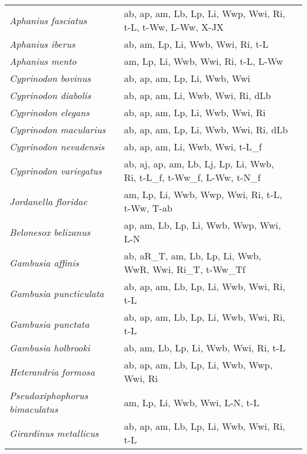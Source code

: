 {\begin{longtable}[c]{p{3.5cm}p{5.5cm}p{5.5cm}}
\emph{Aphanius fasciatus} &  ab, ap, am, Lb, Lp, Li, Wwp, Wwi, Ri, t-L, t-Ww, L-Ww, X-JX & \citet{SezeOlme2010,LeonSini1999,LeonSini1998} \\
\emph{Aphanius iberus} &  ab, am, Lp, Li, Wwb, Wwi, Ri, t-L & \citet{FernHern1988} \\
\emph{Aphanius mento} &  am, Lp, Li, Wwb, Wwi, Ri, t-L, L-Ww & \citet{GuclKucu2008,GuclKucu2011,Ergu2020} \\
\emph{Cyprinodon bovinus} &  ab, ap, am, Lp, Li, Wwb, Wwi & \citet{EPA2002,Cripe2009,Kenn1977,JordEver1896} \\
\emph{Cyprinodon diabolis} &  ab, ap, am, Li, Wwb, Wwi, Ri, dLb & \citet{DeacTay1995} \\
\emph{Cyprinodon elegans} &  ab, ap, am, Lp, Li, Wwb, Wwi, Ri & \citet{LeisItzk2003} \\
\emph{Cyprinodon macularius} &  ab, ap, am, Lp, Li, Wwb, Wwi, Ri, dLb & \citet{Scho1988} \\
\emph{Cyprinodon nevadensis} &  ab, ap, am, Li, Wwb, Wwi, t-L\_f & \citet{LemaNevi2006} \\
\emph{Cyprinodon variegatus} &  ab, aj, ap, am, Lb, Lj, Lp, Li, Wwb, Ri, t-L\_f, t-Ww\_f, L-Ww, t-N\_f & \citet{EPA2002,SchnDuss2017,CripHemm2009,Fost1967,PageBurr1991,JordEver1896,ParrDyar1978,RoseSand2004} \\
\emph{Jordanella floridae} &  am, Lp, Li, Wwb, Wwp, Wwi, Ri, t-L, t-Ww, T-ab & \citet{Beyg2009,FostCair1969,MaryGord2004} \\
\emph{Belonesox belizanus} &  ap, am, Lb, Lp, Li, Wwb, Wwp, Wwi, L-N & \citet{TurnSnel1984} \\
\emph{Gambusia affinis} &  ab, aR\_T, am, Lb, Lp, Li, Wwb, WwR, Wwi, Ri\_T, t-Ww\_Tf & \citet{VondWurt1988,BeadGino2008} \\
\emph{Gambusia puncticulata} &  ab, ap, am, Lb, Lp, Li, Wwb, Wwi, Ri, t-L & \citet{PoncRodr2013} \\
\emph{Gambusia punctata} &  ab, ap, am, Lb, Lp, Li, Wwb, Wwi, Ri, t-L & \citet{PoncRodr2013} \\
\emph{Gambusia holbrooki} &  ab, am, Lb, Lp, Li, Wwb, Wwi, Ri, t-L & \citet{BeadGino2008} \\
\emph{Heterandria formosa} &  ab, ap, am, Lb, Lp, Li, Wwb, Wwp, Wwi, Ri & \citet{Henr1988,Brow2016} \\
\emph{Pseudoxiphophorus bimaculatus} &  am, Lp, Li, Wwb, Wwi, L-N, t-L & \citet{OlinPeop2016} \\
\emph{Girardinus metallicus} &  ab, ap, am, Lb, Lp, Li, Wwb, Wwi, Ri, t-L & \citet{PoncRodr2013} \\

\end{longtable}}
